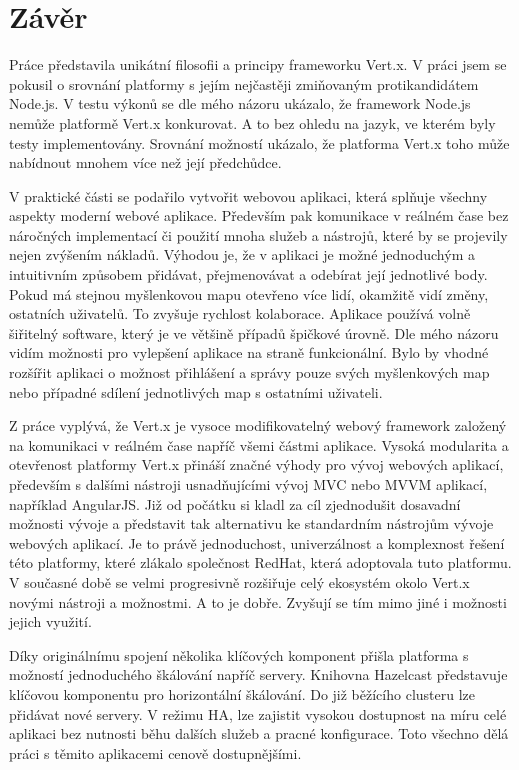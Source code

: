 
\chapter[Závěr]{Závěr}

Práce představila unikátní filosofii a principy frameworku Vert.x. V práci jsem se pokusil o srovnání platformy s jejím nejčastěji zmiňovaným protikandidátem Node.js. V testu výkonů se dle mého názoru ukázalo, že framework Node.js nemůže platformě Vert.x konkurovat. A to bez ohledu na jazyk, ve kterém byly testy implementovány. Srovnání možností ukázalo, že platforma Vert.x toho může nabídnout mnohem více než její předchůdce. 

V praktické části se podařilo vytvořit webovou aplikaci, která splňuje všechny aspekty moderní webové aplikace. Především pak komunikace v reálném čase bez náročných implementací či použití mnoha služeb a nástrojů, které by se projevily nejen zvýšením nákladů. Výhodou je, že v aplikaci je možné jednoduchým a intuitivním způsobem přidávat, přejmenovávat a odebírat její jednotlivé body. Pokud má stejnou myšlenkovou mapu otevřeno více lidí, okamžitě vidí změny, ostatních uživatelů. To zvyšuje rychlost kolaborace. Aplikace používá volně šiřitelný software, který je ve většině případů špičkové úrovně. %
Dle mého názoru vidím možnosti pro vylepšení aplikace na straně funkcionální. Bylo by vhodné rozšířit aplikaci o možnost přihlášení a správy pouze svých myšlenkových map nebo případné sdílení jednotlivých map s ostatními uživateli.

Z práce vyplývá, že Vert.x je vysoce modifikovatelný webový framework založený na komunikaci v reálném čase napříč všemi částmi aplikace. Vysoká modularita a otevřenost platformy Vert.x přináší značné výhody pro vývoj webových aplikací, především s dalšími nástroji usnadňujícími vývoj MVC nebo MVVM aplikací, například AngularJS. Již od počátku si kladl za cíl zjednodušit dosavadní možnosti vývoje a představit tak alternativu ke standardním nástrojům vývoje webových aplikací. Je to právě jednoduchost, univerzálnost a komplexnost řešení této platformy, které zlákalo společnost RedHat, která adoptovala tuto platformu. V současné době se velmi progresivně rozšiřuje celý ekosystém okolo Vert.x novými nástroji a možnostmi. A to je dobře. Zvyšují se tím mimo jiné i možnosti jejich využití.

Díky originálnímu spojení několika klíčových komponent přišla platforma s možností jednoduchého škálování napříč servery. Knihovna Hazelcast představuje klíčovou komponentu pro horizontální škálování. Do již běžícího clusteru lze přidávat nové servery. V režimu HA, lze zajistit vysokou dostupnost na míru celé aplikaci bez nutnosti běhu dalších služeb a pracné konfigurace. Toto všechno dělá práci s těmito aplikacemi cenově dostupnějšími.


